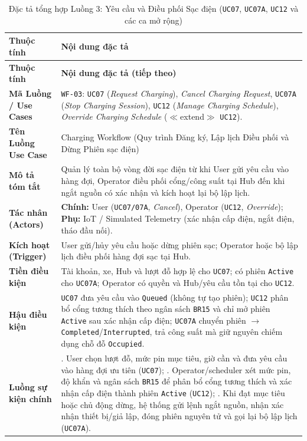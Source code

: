 {\small
\begin{longtable}{>{\raggedright\arraybackslash\bfseries}p{3.5cm} >{\raggedright\arraybackslash}p{\dimexpr\textwidth-3.5cm-4\tabcolsep\relax}}
\caption{Đặc tả tổng hợp Luồng 3: Yêu cầu và Điều phối Sạc điện (\texttt{UC07}, \texttt{UC07A}, \texttt{UC12} và các ca mở rộng)} \label{tab:wf-charging} \\
\toprule
Thuộc tính & \textbf{Nội dung đặc tả} \\
\midrule
\endfirsthead
\toprule
Thuộc tính & \textbf{Nội dung đặc tả (tiếp theo)} \\
\midrule
\endhead
\bottomrule
\endfoot
Mã Luồng / Use Cases & \texttt{WF-03}: \texttt{UC07} (\textit{Request Charging}), \textit{Cancel Charging Request}, \texttt{UC07A} (\textit{Stop Charging Session}), \texttt{UC12} (\textit{Manage Charging Schedule}), \textit{Override Charging Schedule} ($\ll$extend$\gg$ \texttt{UC12}). \\
Tên Luồng Use Case & Charging Workflow (Quy trình Đăng ký, Lập lịch Điều phối và Dừng Phiên sạc điện) \\
Mô tả tóm tắt & Quản lý toàn bộ vòng đời sạc điện từ khi User gửi yêu cầu vào hàng đợi, Operator điều phối cổng/công suất tại Hub đến khi ngắt nguồn có xác nhận và kích hoạt lại bộ lập lịch. \\
Tác nhân (Actors) & \textbf{Chính:} User (\texttt{UC07/07A}, \textit{Cancel}), Operator (\texttt{UC12}, \textit{Override}); \textbf{Phụ:} IoT / Simulated Telemetry (xác nhận cấp điện, ngắt điện, tháo đầu nối). \\
Kích hoạt (Trigger) & User gửi/hủy yêu cầu hoặc dừng phiên sạc; Operator hoặc bộ lập lịch điều phối hàng đợi sạc tại Hub. \\
Tiền điều kiện & Tài khoản, xe, Hub và lượt đỗ hợp lệ cho \texttt{UC07}; có phiên \texttt{Active} cho \texttt{UC07A}; Operator có quyền và Hub/yêu cầu tồn tại cho \texttt{UC12}. \\
Hậu điều kiện & \texttt{UC07} đưa yêu cầu vào \texttt{Queued} (không tự tạo phiên); \texttt{UC12} phân bổ cổng tương thích theo ngân sách \texttt{BR15} và chỉ mở phiên \texttt{Active} sau xác nhận cấp điện; \texttt{UC07A} chuyển phiên $\rightarrow$ \texttt{Completed}/\texttt{Interrupted}, trả công suất mà giữ nguyên chiếm dụng chỗ đỗ \texttt{Occupied}. \\
Luồng sự kiện chính & 1. User chọn lượt đỗ, mức pin mục tiêu, giờ cần và đưa yêu cầu vào hàng đợi ưu tiên (\texttt{UC07}); \newline 2. Operator/scheduler xét mức pin, độ khẩn và ngân sách \texttt{BR15} để phân bổ cổng tương thích và xác nhận cấp điện thành phiên \texttt{Active} (\texttt{UC12}); \newline 3. Khi đạt mục tiêu hoặc chủ động dừng, hệ thống gửi lệnh ngắt nguồn, nhận xác nhận thiết bị/giả lập, đóng phiên nguyên tử và gọi lại bộ lập lịch (\texttt{UC07A}). \\

\end{longtable}}
